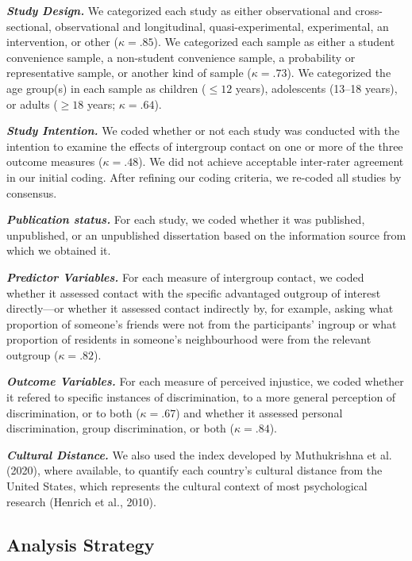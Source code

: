 \documentclass[12pt, letterpaper]{article}
\begin{document}
\textbf{\emph{Study Design.}} We categorized each study as either
observational and cross-sectional, observational and longitudinal,
quasi-experimental, experimental, an intervention, or other
(\(\kappa = .85\)). We categorized each sample as either a student
convenience sample, a non-student convenience sample, a probability or
representative sample, or another kind of sample (\(\kappa = .73\)). We
categorized the age group(s) in each sample as children (\(\leq 12\)
years), adolescents (13--18 years), or adults (\(\geq 18\) years;
\(\kappa = .64\)).

\textbf{\emph{Study Intention.}} We coded whether or not each study was
conducted with the intention to examine the effects of intergroup
contact on one or more of the three outcome measures (\(\kappa = .48\)).
We did not achieve acceptable inter-rater agreement in our initial
coding. After refining our coding criteria, we re-coded all studies by
consensus.

\textbf{\emph{Publication status.}} For each study, we coded whether it
was published, unpublished, or an unpublished dissertation based on the
information source from which we obtained it.

\textbf{\emph{Predictor Variables.}} For each measure of intergroup
contact, we coded whether it assessed contact with the specific
advantaged outgroup of interest directly---or whether it assessed
contact indirectly by, for example, asking what proportion of someone's
friends were not from the participants' ingroup or what proportion of
residents in someone's neighbourhood were from the relevant outgroup
(\(\kappa = .82\)).

\textbf{\emph{Outcome Variables.}} For each measure of perceived
injustice, we coded whether it refered to specific instances of
discrimination, to a more general perception of discrimination, or to
both (\(\kappa = .67\)) and whether it assessed personal discrimination,
group discrimination, or both (\(\kappa = .84\)).

\textbf{\emph{Cultural Distance.}} We also used the index developed by
Muthukrishna et al. (2020), where available, to quantify each country's
cultural distance from the United States, which represents the cultural
context of most psychological research (Henrich et al., 2010).

\hypertarget{analysis-strategy}{%
\subsection{Analysis Strategy}\label{analysis-strategy}}
\end{document}
